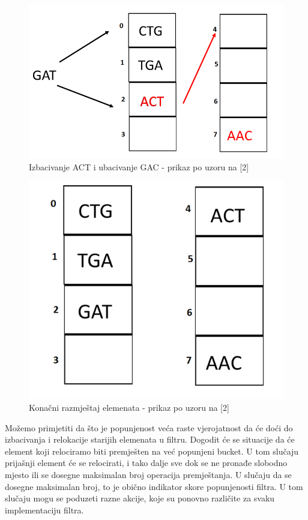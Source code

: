 \documentclass[times, utf8, seminar, numeric]{fer}
\begin{document}
\begin{figure}[H]
  \centering
  \setlength{\intextsep}{5pt}
  \includegraphics[scale = 0.4]{images/swap2.png}
  \caption{Izbacivanje ACT i ubacivanje GAC - prikaz po uzoru na [2]}
  \label{fig_swap2}
\end{figure}

\begin{figure}[H]
  \centering
  \setlength{\intextsep}{5pt}
  \includegraphics[scale = 0.4]{images/finalalign.png}
  \caption{Konačni razmještaj elemenata - prikaz po uzoru na [2]}
  \label{fig_finalalign}
\end{figure}

Možemo primjetiti da što je popunjenost veća raste vjerojatnost da će doći do izbacivanja i relokacije starijih elemenata u filtru. Dogodit će se situacije da će element koji relociramo biti premješten na već popunjeni bucket. U tom slučaju prijašnji element će se relocirati, i tako dalje sve dok se ne pronađe slobodno mjesto ili se dosegne maksimalan broj operacija premještanja. U slučaju da se dosegne maksimalan broj, to je obično indikator skore popunjenosti filtra. U tom slučaju mogu se poduzeti razne akcije, koje su ponovno različite za svaku implementaciju filtra. \\
\end{document}
